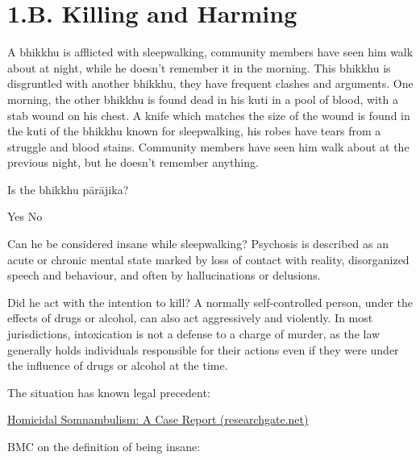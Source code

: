 \chapter{1.B. Killing and Harming}
\renewcommand*{\theChapterTitle}{1.B. Killing and Harming}

\begin{exam}{\autoExamName}

\begin{problem}

  A bhikkhu is afflicted with sleepwalking, community members have seen him walk about at night, while he doesn't remember it in the morning.
  This bhikkhu is disgruntled with another bhikkhu, they have frequent clashes and arguments.
  One morning, the other bhikkhu is found dead in his kuti in a pool of blood, with a stab wound on his chest.
  A knife which matches the size of the wound is found in the kuti of the bhikkhu known for sleepwalking, his robes have tears from a struggle and blood stains.
  Community members have seen him walk about at the previous night, but he doesn't remember anything.

  \bigskip

  Is the bhikkhu pārājika?

  \bigskip

  \begin{answers}{2}
    \bChoices
     Yes\eAns
     No\eAns
    \eChoices
  \end{answers}

  \begin{solution}
    Can he be considered insane while sleepwalking? Psychosis is described as an acute or chronic mental state marked by loss of contact with reality, disorganized speech and behaviour, and often by hallucinations or delusions.

    Did he act with the intention to kill? A normally self-controlled person, under the effects of drugs or alcohol, can also act aggressively and violently. In most jurisdictions, intoxication is not a defense to a charge of murder, as the law generally holds individuals responsible for their actions even if they were under the influence of drugs or alcohol at the time.

    The situation has known legal precedent:

    \href{https://www.researchgate.net/publication/15260363_Homicidal_Somnambulism_A_Case_Report}{Homicidal Somnambulism: A Case Report (researchgate.net)}

    BMC on the definition of being insane:


\end{solution}
\end{problem}
\end{exam}
